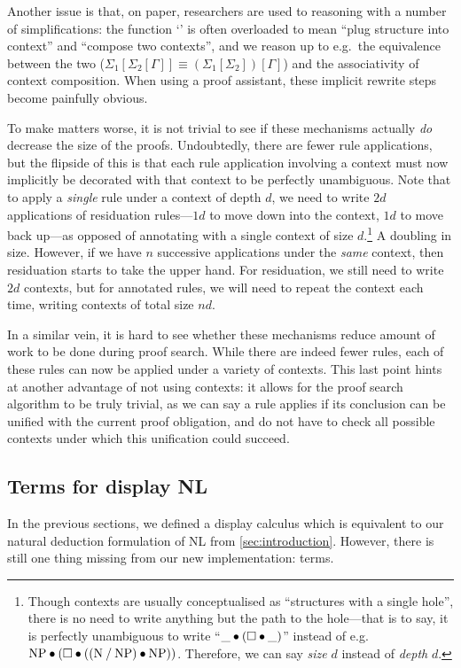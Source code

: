 Another issue is that, on paper, researchers are used to reasoning
with a number of simplifications: the function `\plug' is often
overloaded to mean ``plug structure into context'' and ``compose two
contexts'', and we reason up to e.g.\ the equivalence between the two
($\Sigma_1[\Sigma_2[\Gamma]]\equiv (\Sigma_1[\Sigma_2])[\Gamma]$) and
the associativity of context composition. When using a proof
assistant, these implicit rewrite steps become painfully obvious.

To make matters worse, it is not trivial to see if these mechanisms
actually \emph{do} decrease the size of the proofs. Undoubtedly, there
are fewer rule applications, but the flipside of this is that each
rule application involving a context must now implicitly be decorated
with that context to be perfectly unambiguous.
Note that to apply a \emph{single} rule under a context of depth $d$,
we need to write $2d$ applications of residuation rules---$1d$ to move
down into the context, $1d$ to move back up---as opposed of annotating
with a single context of size $d$.\footnote{%
  Though contexts are usually conceptualised as ``structures with a
  single hole'', there is no need to write anything but the path to
  the hole---that is to say, it is perfectly unambiguous to write
  ``$\_\bullet(\square\bullet\_)$'' instead of e.g.\
  $\text{NP}\bullet(\square\bullet((\text{N}\mathbin{\slash}\text{NP})\bullet\text{NP}))$. Therefore, we can
  say \emph{size} $d$ instead of \emph{depth} $d$.
}
A doubling in size. However, if we have $n$ successive applications
under the \emph{same} context, then residuation starts to take the
upper hand. For residuation, we still need to write $2d$ contexts, but
for annotated rules, we will need to repeat the context each time,
writing contexts of total size $nd$.

In a similar vein, it is hard to see whether these mechanisms reduce
amount of work to be done during proof search. While there are indeed
fewer rules, each of these rules can now be applied under a variety of
contexts.
This last point hints at another advantage of not using contexts: it
allows for the proof search algorithm to be truly trivial, as we can
say a rule applies if its conclusion can be unified with the current
proof obligation, and do not have to check all possible contexts under
which this unification could succeed.



\subsection{Terms for display NL}
\label{sec:translation-to-lamET}
In the previous sections, we defined a display calculus which is
equivalent to our natural deduction formulation of NL from
\autoref{sec:introduction}. However, there is still one thing missing
from our new implementation: terms.

